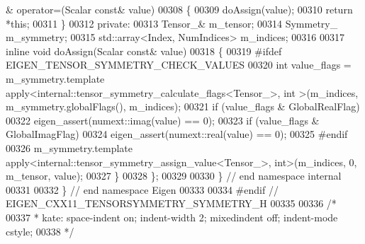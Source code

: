 \begin{DoxyCode}
      & operator=(Scalar \textcolor{keyword}{const}& value)
00308     \{
00309       doAssign(value);
00310       \textcolor{keywordflow}{return} *\textcolor{keyword}{this};
00311     \}
00312   \textcolor{keyword}{private}:
00313     Tensor\_& m\_tensor;
00314     Symmetry\_ m\_symmetry;
00315     std::array<Index, NumIndices> m\_indices;
00316 
00317     \textcolor{keyword}{inline} \textcolor{keywordtype}{void} doAssign(Scalar \textcolor{keyword}{const}& value)
00318     \{
00319 \textcolor{preprocessor}{      #ifdef EIGEN\_TENSOR\_SYMMETRY\_CHECK\_VALUES}
00320         \textcolor{keywordtype}{int} value\_flags = m\_symmetry.template apply<internal::tensor\_symmetry\_calculate\_flags<Tensor\_>, \textcolor{keywordtype}{int}
      >(m\_indices, m\_symmetry.globalFlags(), m\_indices);
00321         \textcolor{keywordflow}{if} (value\_flags & GlobalRealFlag)
00322           eigen\_assert(numext::imag(value) == 0);
00323         \textcolor{keywordflow}{if} (value\_flags & GlobalImagFlag)
00324           eigen\_assert(numext::real(value) == 0);
00325 \textcolor{preprocessor}{      #endif}
00326       m\_symmetry.template apply<internal::tensor\_symmetry\_assign\_value<Tensor\_>, \textcolor{keywordtype}{int}>(m\_indices, 0, 
      m\_tensor, value);
00327     \}
00328 \};
00329 
00330 \} \textcolor{comment}{// end namespace internal}
00331 
00332 \} \textcolor{comment}{// end namespace Eigen}
00333 
00334 \textcolor{preprocessor}{#endif // EIGEN\_CXX11\_TENSORSYMMETRY\_SYMMETRY\_H}
00335 
00336 \textcolor{comment}{/*}
00337 \textcolor{comment}{ * kate: space-indent on; indent-width 2; mixedindent off; indent-mode cstyle;}
00338 \textcolor{comment}{ */}
\end{DoxyCode}
